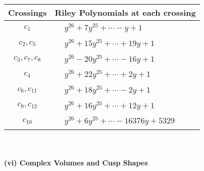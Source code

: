 \documentclass[1p]{elsarticle_modified}
\theoremstyle{definition}
\begin{document}
\begin{tabular}{m{50pt}|m{274pt}}
Crossings & \hspace{64pt}Riley Polynomials at each crossing \\
\hline $$\begin{aligned}c_{1}\end{aligned}$$&$\begin{aligned}
&y^{26}+7 y^{25}+\cdots- y+1
\end{aligned}$\\
\hline $$\begin{aligned}c_{2},c_{5}\end{aligned}$$&$\begin{aligned}
&y^{26}+15 y^{25}+\cdots+19 y+1
\end{aligned}$\\
\hline $$\begin{aligned}c_{3},c_{7},c_{8}\end{aligned}$$&$\begin{aligned}
&y^{26}-20 y^{25}+\cdots-16 y+1
\end{aligned}$\\
\hline $$\begin{aligned}c_{4}\end{aligned}$$&$\begin{aligned}
&y^{26}+22 y^{25}+\cdots+2 y+1
\end{aligned}$\\
\hline $$\begin{aligned}c_{6},c_{11}\end{aligned}$$&$\begin{aligned}
&y^{26}+18 y^{25}+\cdots-2 y+1
\end{aligned}$\\
\hline $$\begin{aligned}c_{9},c_{12}\end{aligned}$$&$\begin{aligned}
&y^{26}+16 y^{25}+\cdots+12 y+1
\end{aligned}$\\
\hline $$\begin{aligned}c_{10}\end{aligned}$$&$\begin{aligned}
&y^{26}+6 y^{25}+\cdots-16376 y+5329
\end{aligned}$\\
\hline
\end{tabular}\\~\\
\newpage\flushleft \textbf{(vi) Complex Volumes and Cusp Shapes}
\end{document}
